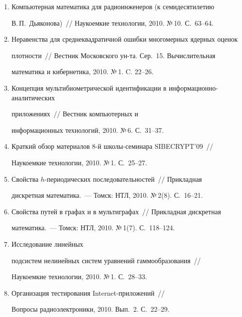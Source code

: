 \begin{enumerate}[1.]
С.~60--65.


\item {}


Компьютерная математика для радиоинженеров (к семидесятилетию 


В.\,П.~Дьяконова)~/\!\!/  Наукоемкие технологии, 2010. №\,10. С.~63--64.


\item {}


Неравенства для среднеквадратичной ошибки многомерных ядерных оценок 


плотности~/\!\!/  Вестник Московского ун-та. Сер.\ 15. Вычислительная 


математика и кибернетика, 2010. №\,1. C. 22--26.


\item {}


Концепция мультибиометрической идентификации в ин\-фор\-ма\-ци\-он\-но-аналитических 


приложениях~/\!\!/  Вестник компьютерных и 


информационных технологий, 2010. №\,6. С.~31--37.


\item {}


Краткий обзор материалов 8-й школы-семинара SIBECRYPT'09~/\!\!/  


Наукоемкие технологии, 2010. №\,1. С.~25--27.


\item {}


Свойства $h$-периодических последовательностей~/\!\!/  Прикладная 


дискретная математика.~--- Томск: НТЛ, 2010. №\,2(8). С.~16--21.


\item {}


Свойства путей в графах и в мультиграфах~/\!\!/  Прикладная дискретная 


математика.~--- Томск: НТЛ, 2010. №\,1(7). С.~118--124.


\item {} Исследование линейных 


подсис\-тем нелинейных сис\-тем уравнений гаммообразования~/\!\!/  


Наукоемкие технологии, 2010. №\,1. С.~28--33.


\item {} Организация тестирования Internet-приложений~/\!\!/  


Вопросы радиоэлектроники, 2010. Вып.~2. С.~22--29.


\end{enumerate}





